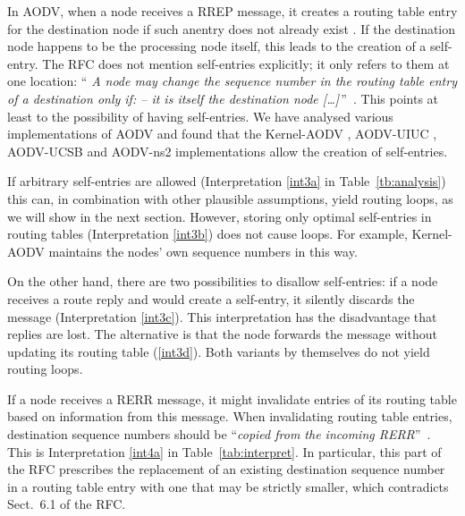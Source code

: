 \documentclass[letterpaper]{sig-alternate-pages}
\newcommand{\rte}{routing table entry\xspace}
\renewcommand{\sf}{\it}
\begin{document}
In AODV, when a node receives a RREP message, it creates a routing table entry for the
  destination node if such an\pagebreak[4] entry does not already exist \cite[Sect. 6.7]{rfc3561}. If the destination node
  happens to be the processing node itself, this leads to the creation of a self-entry. The RFC does
  not mention self-entries explicitly; it only refers to them at one location:
  ``{\sf 
  A node may change the sequence number in the routing table entry of a 
   destination only if: --  it is itself the destination node {[\dots]}\,}''~\cite[Sect. 6.1]{rfc3561}.
This points at least to the possibility of having self-entries. We have analysed various implementations of AODV and found that the Kernel-AODV \cite{AODVNIST}, AODV-UIUC \cite{Kawadia03}, AODV-UCSB \cite{CB04} and AODV-ns2 implementations allow the creation of self-entries.

If arbitrary self-entries are allowed (Interpretation \ref{int3a} in Table~\ref{tb:analysis}) this can, in combination with other plausible
assumptions, yield routing loops, as we will show in the next section. 
However, storing only optimal self-entries  in routing tables (Interpretation \ref{int3b}) does not cause loops.
For example, Kernel-AODV maintains the nodes' own sequence numbers in this way.




On the other hand, there are two possibilities to disallow self-entries: 
if a node receives a route reply and would create a self-entry, it silently discards the message (Interpretation \ref{int3c}). 
This interpretation has the disadvantage that replies are lost. 
The alternative is that  the node forwards the message without updating its routing table (\ref{int3d}).
Both variants by themselves do not yield routing loops. 

If a node receives a RERR message, it might invalidate entries of its routing table based on information 
from this message. When invalidating routing table entries, destination sequence numbers
should be ``{\sf copied from the incoming RERR\/}''~\cite[Sect.~6.11]{rfc3561}.
This is Interpretation \ref{int4a} in Table~\ref{tab:interpret}.
In particular, this part of the RFC prescribes the replacement of an
existing destination sequence number in a \rte with one that
may be strictly smaller, which contradicts Sect.~6.1 of the RFC\@.
\end{document}
